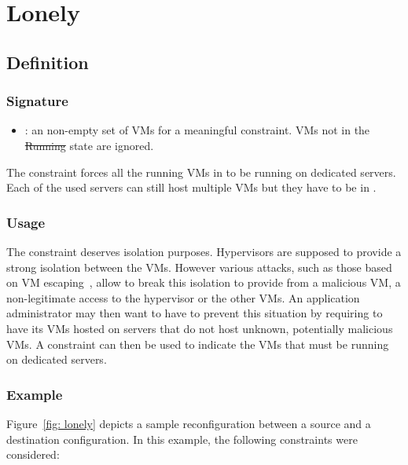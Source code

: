 \section{Lonely}

\subsection{Definition}

\subsubsection{Signature} 

\begin{itemize}
\item {} : an non-empty set of VMs for a meaningful constraint. VMs not in the \st{Running} state are ignored.
\end{itemize}

The  constraint forces all the running VMs in  to be running on dedicated servers.
Each of the used servers can still host multiple VMs but they have to be in .


\subsubsection{Usage}

The  constraint deserves isolation purposes. Hypervisors are supposed
to provide a strong isolation between the VMs. However various attacks, such as those based on 
VM escaping~\cite{wojtczuk},
allow to break this isolation to provide from a malicious VM, a non-legitimate access to the hypervisor or the other VMs.
An application administrator may then want to have to prevent this situation by requiring to have its VMs hosted on servers that do not host unknown, potentially malicious VMs. A  constraint can then be used to indicate the VMs that must be running on dedicated servers.

\subsubsection{Example}

Figure~\ref{fig: lonely} depicts a sample reconfiguration between a source and a destination configuration. In this example, the following  constraints were considered:

